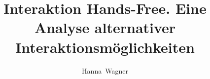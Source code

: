 \documentclass[bachelor,german]{hgbthesis}
\title{Interaktion Hands-Free. Eine Analyse alternativer Interaktionsmöglichkeiten}
\author{Hanna\ Wagner}
\begin{document}

\frontmatter                    %

\maketitle
\tableofcontents
\listoffigures
\listoftables

		
			

\mainmatter          %











\MakeBibliography                        %

\end{document}
